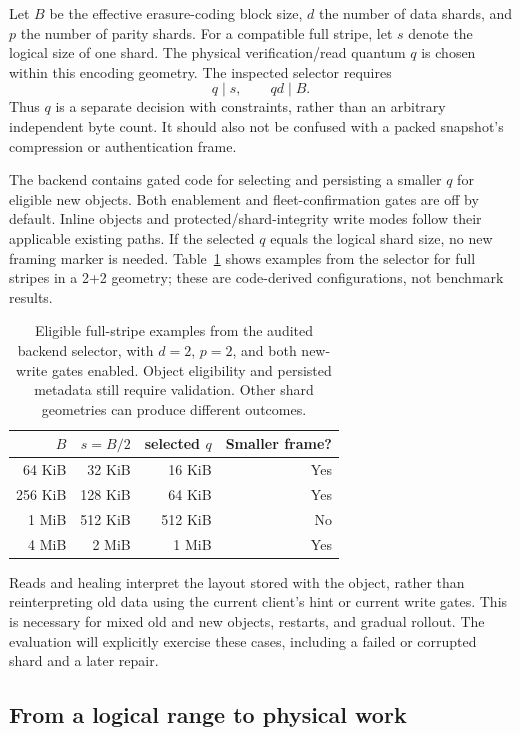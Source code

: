 Let $B$ be the effective erasure-coding block size, $d$ the number of data
shards, and $p$ the number of parity shards. For a compatible full stripe,
let $s$ denote the logical size of one shard. The physical verification/read
quantum $q$ is chosen within this encoding geometry. The inspected selector
requires
\begin{equation}
q\mid s, \qquad qd\mid B.
\end{equation}
Thus $q$ is a separate decision with constraints, rather than an arbitrary
independent byte count. It should also not be confused with a packed
snapshot's compression or authentication frame.

The backend contains gated code for selecting and persisting a smaller $q$
for eligible new objects. Both enablement and fleet-confirmation gates are
off by default. Inline objects and protected/shard-integrity write modes
follow their applicable existing paths. If the selected $q$ equals the
logical shard size, no new framing marker is needed. Table~\ref{tab:geometry}
shows examples from the selector for full stripes in a 2+2 geometry; these
are code-derived configurations, not benchmark results.

\begin{table}[t]
\centering
\begin{tabular}{rrrr}
\toprule
$B$ & $s=B/2$ & selected $q$ & Smaller frame?\\
\midrule
64 KiB & 32 KiB & 16 KiB & Yes\\
256 KiB & 128 KiB & 64 KiB & Yes\\
1 MiB & 512 KiB & 512 KiB & No\\
4 MiB & 2 MiB & 1 MiB & Yes\\
\bottomrule
\end{tabular}
\caption{Eligible full-stripe examples from the audited backend selector,
with $d=2$, $p=2$, and both new-write gates enabled. Object eligibility and
persisted metadata still require validation. Other shard geometries can
produce different outcomes.}
\label{tab:geometry}
\end{table}

Reads and healing interpret the layout stored with the object, rather than
reinterpreting old data using the current client's hint or current write
gates. This is necessary for mixed old and new objects, restarts, and gradual
rollout. The evaluation will explicitly exercise these cases, including a
failed or corrupted shard and a later repair.

\subsection{From a logical range to physical work}

